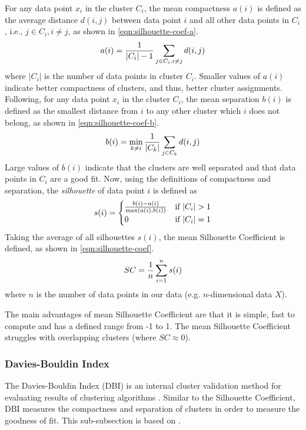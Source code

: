 For any data point $x_i$ in the cluster $C_i$, the mean compactness $a(i)$ is defined as the average distance $d(i, j)$ between data point $i$ and all other data points in $C_i$, i.e., $j \in C_i, i \neq j$, as shown in \cref{eqn:silhouette-coef-a}.
\begin{align}
    a(i) = \frac{1}{|C_i| - 1} \sum\limits_{j \in C_i, i \neq j}^{}{d(i, j)}
    \label{eqn:silhouette-coef-a}
\end{align}
where $|C_i|$ is the number of data points in cluster $C_i$. Smaller values of $a(i)$ indicate better compactness of clusters, and thus, better cluster assignments. Following, for any data point $x_i$ in the cluster $C_i$, the mean separation $b(i)$ is defined as the smallest distance from $i$ to any other cluster which $i$ does not belong, as shown in \cref{eqn:silhouette-coef-b}.
\begin{align}
    b(i) = \min_{k \neq i} \frac{1}{|C_k|} \sum\limits_{j \in C_k}^{}{d(i, j)}
    \label{eqn:silhouette-coef-b}
\end{align}
Large values of $b(i)$ indicate that the clusters are well separated and that data points in $C_i$ are a good fit. Now, using the definitions of compactness and separation, the \textit{silhouette} of data point $i$ is defined as
\begin{align}
    s(i) = \begin{cases}
        \frac{b(i) - a(i)}{\max \left(a(i), b(i)\right)} & \mbox{if } |C_i| > 1 \\
        0 & \mbox{if } |C_i| = 1
    \end{cases}
\end{align}
Taking the average of all silhouettes $s(i)$, the mean Silhouette Coefficient is defined, as shown in \cref{eqn:silhouette-coef}.
\begin{align}
    SC = \frac{1}{n} \sum\limits_{i=1}^{n}{s(i)}
    \label{eqn:silhouette-coef}
\end{align}
where $n$ is the number of data points in our data (e.g. $n$-dimensional data $X$).

The main advantages of mean Silhouette Coefficient are that it is simple, fast to compute and has a defined range from -1 to 1. The mean Silhouette Coefficient struggles with overlapping clusters (where $SC \approx 0$).

\subsubsection{Davies-Bouldin Index}
\label{sec:davies-bouldin-index}
The Davies-Bouldin Index (DBI) is an internal cluster validation method for evaluating results of clustering algorithms \cite{DaviesBouldin1979}. Similar to the Silhouette Coefficient, DBI measures the compactness and separation of clusters in order to measure the goodness of fit. This sub-subsection is based on \cite{DaviesBouldin1979}.

